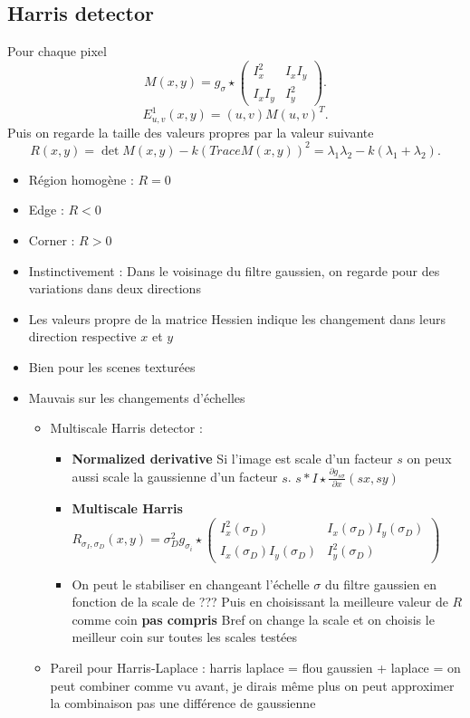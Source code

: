 \documentclass{article}
\theoremstyle{plain}%
\theoremstyle{definition}
\theoremstyle{remark}
\begin{document}
\subsection{Harris detector}
Pour chaque pixel 
\[
    M(x,y) = g_\sigma \star \begin{pmatrix}
        I_x^2 & I_x I_y \\
        I_x I_y & I_y^2
    \end{pmatrix}
.\]
\[
    E^1_{u,v}(x, y) = (u,v)M(u,v)^T
.\]
Puis on regarde la taille des valeurs propres par la valeur suivante
\[
    R(x,y) = \det M(x,y) - k (Trace M(x,y))^2 = \lambda _1 \lambda _2 - k (\lambda _1 + \lambda _2)
.\]
\begin{itemize}
    \item Région homogène : $ R = 0 $
    \item Edge : $ R < 0 $
    \item Corner : $ R > 0 $
\end{itemize}

\begin{itemize}
    \item Instinctivement : Dans le voisinage du filtre gaussien, on regarde pour des variations dans deux directions
    \item Les valeurs propre de la matrice Hessien indique les changement dans leurs direction respective $ x $ et $ y $ 
    \item Bien pour les scenes texturées
    \item Mauvais sur les changements d'échelles \begin{itemize}
        \item Multiscale Harris detector : \begin{itemize}
            \item \textbf{Normalized derivative} Si l'image est scale d'un facteur $ s $ on peux aussi scale la gaussienne d'un facteur $ s $. $ s * I \star \frac{\partial g_{s \sigma }}{\partial x} (sx, sy) $ 
            \item \textbf{Multiscale Harris} $ R_{\sigma _I, \sigma _D}(x,y) = \sigma _D^2 g_{\sigma _i} \star \begin{pmatrix}
                I_x^2(\sigma _D) & I_x(\sigma _D) I_y(\sigma _D) \\
                I_x(\sigma _D) I_y(\sigma _D) & I_y^2(\sigma _D)
            \end{pmatrix} $
            \item On peut le stabiliser en changeant l'échelle $ \sigma $ du filtre gaussien en fonction de la scale de ??? Puis en choisissant la meilleure valeur de $ R $ comme coin \textbf{pas compris} Bref on change la scale et on choisis le meilleur coin sur toutes les scales testées
            \end{itemize}
        \item Pareil pour Harris-Laplace : harris laplace = flou gaussien + laplace = on peut combiner comme vu avant, je dirais même plus on peut approximer la combinaison pas une différence de gaussienne
    \end{itemize}
\end{itemize}
\end{document}
